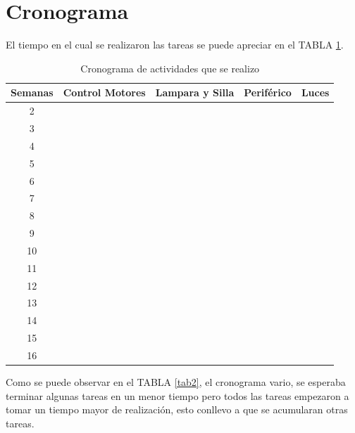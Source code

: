 \documentclass[twocolumn]{IEEEtran}
\begin{document}
\section{Cronograma}
\noindent
El tiempo en el cual se realizaron las tareas se puede apreciar en el TABLA \ref{tab1}.
\begin{table}[H]
	\centering
\begin{tabular}{|c|c|c|c|c|}\hline
Semanas & Control Motores & Lampara y Silla & Periférico & Luces \\ \hline
2 & & & & \\ \hline
3 & & & & \\ \hline
4 & & & & \\ \hline
5 & & & & \\ \hline
6 & & & & \\ \hline
7 & & & & \\ \hline
8 & & & & \\ \hline
9 & & & & \\ \hline
10 & & & & \\ \hline
11 & \cellcolor{black} & & & \\ \hline
12 & \cellcolor{black} & & & \\ \hline
13 & \cellcolor{black} & \cellcolor{black} & & \cellcolor{black} \\ \hline
14 & \cellcolor{black} & \cellcolor{black} & \cellcolor{black} & \cellcolor{black} \\ \hline
15 & \cellcolor{black} & \cellcolor{black} & \cellcolor{black} & \cellcolor{black} \\ \hline
16 & & & & \\ \hline
    \end{tabular}
	\caption{Cronograma de actividades que se realizo}
	\label{tab1}
\end{table}
\noindent
Como se puede observar en el TABLA \ref{tab2}, el cronograma vario, se esperaba terminar algunas tareas en un menor tiempo pero todos las tareas empezaron a tomar un tiempo mayor de realización, esto conllevo a que se acumularan otras tareas.
\end{document}
